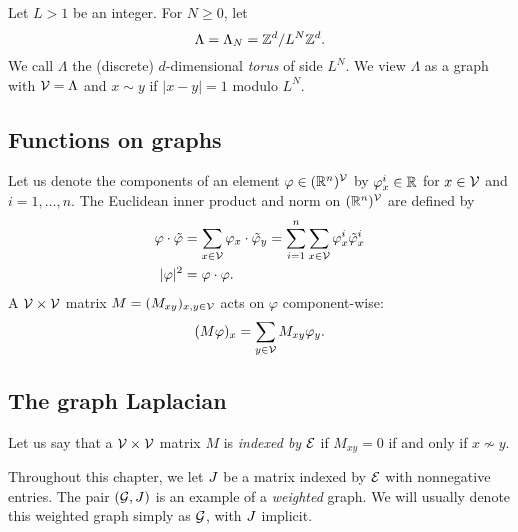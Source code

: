 \begin{example}
Let $L > 1$ be an integer. For $N \ge 0$, let
\begin{equation}
\label{e:Lambda-torus}
\Lambda = \Lambda_N = { {{\mathbb Z}}^d }/L^N{ {{\mathbb Z}}^d }.
\end{equation}
We call $\Lambda$ the (discrete) $d$-dimensional \emph{torus} of side $L^N$.
We view $\Lambda$ as a graph with $\mathcal{V} = \Lambda$ and $x \sim y$
if $|x - y| = 1$ modulo $L^N$.
\end{example}


\subsection{Functions on graphs}

Let us denote the components of an element $\varphi \in ({\mathbb R}^n)^{\mathcal{V}}$ by
$\varphi^i_x \in {\mathbb R}$ for $x \in \mathcal{V}$ and $i = 1, \ldots, n$.
The Euclidean inner product and norm on $({\mathbb R}^n)^{\mathcal{V}}$
are defined by
\begin{align}
\varphi\cdot\tilde\varphi
	&= \sum_{x\in\mathcal{V}} \varphi_x \cdot \tilde\varphi_y
  		= \sum_{i=1}^n \sum_{x\in\mathcal{V}} \varphi^i_x \tilde\varphi^i_x \\
|\varphi|^2
	&= \varphi \cdot \varphi.
\end{align}
A $\mathcal{V}\times\mathcal{V}$ matrix $M = (M_{xy})_{x,y\in\mathcal{V}}$ acts on $\varphi$
component-wise:
\begin{equation}
(M \varphi)_x = \sum_{y\in\mathcal{V}} M_{xy} \varphi_y.
\end{equation}


\subsection{The graph Laplacian}

Let us say that a $\mathcal{V}\times\mathcal{V}$ matrix $M$ is \emph{indexed by} $\mathcal{E}$
if $M_{xy} = 0$ if and only if $x \not\sim y$.

Throughout this chapter, we let $J$ be a matrix indexed by $\mathcal{E}$ with nonnegative entries.
The pair $(\mathcal{G}, J)$ is an example of a \emph{weighted} graph.
We will usually denote this weighted graph simply as $\mathcal{G}$, with $J$
implicit.

